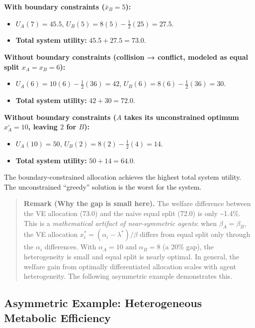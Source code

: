 \documentclass[11pt]{article}
\theoremstyle{plain}
\theoremstyle{definition}
\theoremstyle{remark}
\let\origsubsection\subsection
\renewcommand{\subsection}{\needspace{7\baselineskip}\origsubsection}
\providecommand{\tightlist}{%
  \setlength{\itemsep}{0pt}\setlength{\parskip}{0pt}}
\begin{document}
\textbf{With boundary constraints (\(\bar{x}_B = 5\)):}

\begin{itemize}
\tightlist
\item
  \(U_A(7) = 45.5\), \(U_B(5) = 8(5) - \frac{1}{2}(25) = 27.5\).
\item
  \textbf{Total system utility:} \(45.5 + 27.5 = 73.0\).
\end{itemize}

\textbf{Without boundary constraints (collision → conflict, modeled as
equal split \(x_A = x_B = 6\)):}

\begin{itemize}
\tightlist
\item
  \(U_A(6) = 10(6) - \frac{1}{2}(36) = 42\),
  \(U_B(6) = 8(6) - \frac{1}{2}(36) = 30\).
\item
  \textbf{Total system utility:} \(42 + 30 = 72.0\).
\end{itemize}

\textbf{Without boundary constraints (\(A\) takes its unconstrained
optimum \(x_A^{\circ} = 10\), leaving \(2\) for \(B\)):}

\begin{itemize}
\tightlist
\item
  \(U_A(10) = 50\), \(U_B(2) = 8(2) - \frac{1}{2}(4) = 14\).
\item
  \textbf{Total system utility:} \(50 + 14 = 64.0\).
\end{itemize}

The boundary-constrained allocation achieves the highest total system
utility. The unconstrained ``greedy'' solution is the worst for the
system.

\begin{quote}
\textbf{Remark (Why the gap is small here).} The welfare difference
between the VE allocation (73.0) and the naive equal split (72.0) is
only \textasciitilde1.4\%. This is a \emph{mathematical artifact of
near-symmetric agents}: when \(\beta_A = \beta_B\), the VE allocation
\(x_i^* = (\alpha_i - \lambda^*)/\beta\) differs from equal split only
through the \(\alpha_i\) differences. With \(\alpha_A = 10\) and
\(\alpha_B = 8\) (a 20\% gap), the heterogeneity is small and equal
split is nearly optimal. In general, the welfare gain from optimally
differentiated allocation scales with agent heterogeneity. The following
asymmetric example demonstrates this.
\end{quote}

\subsection{Asymmetric Example: Heterogeneous Metabolic
Efficiency}\label{asymmetric-example-heterogeneous-metabolic-efficiency}
\end{document}

